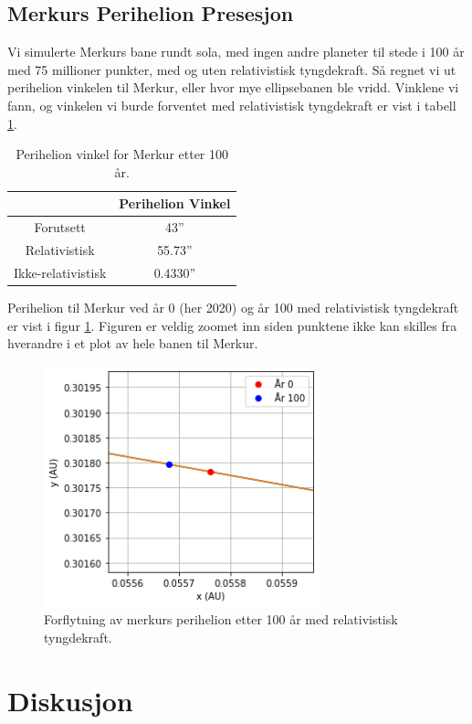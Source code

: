 \documentclass[reprint,english,notitlepage]{revtex4-1}
\begin{document}
\subsection{Merkurs Perihelion Presesjon}
	Vi simulerte Merkurs bane rundt sola, med ingen andre planeter til stede i 100 år med 75 millioner punkter, med og uten relativistisk tyngdekraft. Så regnet vi ut perihelion vinkelen til Merkur, eller hvor mye ellipsebanen ble vridd. Vinklene vi fann, og vinkelen vi burde forventet med relativistisk tyngdekraft\cite{oppgave} er vist i tabell \ref{tab:peri}.
	\begin{table}[H]
		\begin{center}
			\caption{Perihelion vinkel for Merkur etter 100 år.}
			\label{tab:peri}
			\begin{tabular}{|c|c|} \hline
				\textbf{} & \textbf{Perihelion Vinkel} \\ \hline
				Forutsett & 43'' \\
				Relativistisk & 55.73'' \\
				Ikke-relativistisk & 0.4330'' \\ \hline
			\end{tabular}
		\end{center}
	\end{table}
	Perihelion til Merkur ved år 0 (her 2020) og år 100 med relativistisk tyngdekraft er vist i figur \ref{fig:peri}. Figuren er veldig zoomet inn siden punktene ikke kan skilles fra hverandre i et plot av hele banen til Merkur.
	\begin{figure}[H]
		\includegraphics[width=80mm]{../../Code/Figures/peri.png}
		\caption{Forflytning av merkurs perihelion etter 100 år med relativistisk tyngdekraft.}
		\label{fig:peri}
	\end{figure}

	
\section{Diskusjon} %
\end{document}
